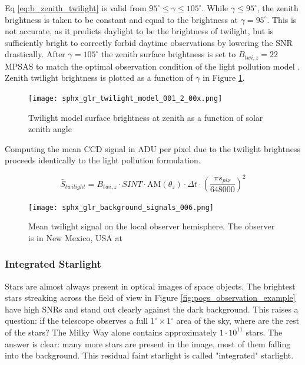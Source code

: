 Eq \ref{eq:b_zenith_twilight} is valid from $95^\circ \leq \gamma \leq 105^\circ$. While $\gamma \le 95^\circ$, the zenith brightness is taken to be constant and equal to the brightness at $\gamma = 95^\circ$. This is not accurate, as it predicts daylight to be the brightness of twilight, but is sufficiently bright to correctly forbid daytime observations by lowering the SNR drastically. After $\gamma = 105^\circ$ the zenith surface brightness is set to $B_{twi,z} = 22$ MPSAS to match the optimal observation condition of the light pollution model \cite{krag2003}. Zenith twilight brightness is plotted as a function of $\gamma$ in Figure \ref{fig:twilight_model}.

\begin{figure}[ht]
  \centering
  \texttt{[image: sphx\_glr\_twilight\_model\_001\_2\_00x.png]}
  \caption{Twilight model surface brightness at zenith as a function of solar zenith angle}
  \label{fig:twilight_model}
\end{figure}

Computing the mean CCD signal in ADU per pixel due to the twilight brightness proceeds identically to the light pollution formulation. 

\begin{equation} \label{eq:twilight_adu}
  \bar{S}_{twilight} = B_{twi,z} \cdot SINT \cdot \textrm{AM}(\theta_z) \cdot \Delta t \cdot \left( \frac{\pi s_{pix}}{648000} \right)^2
\end{equation}

\begin{figure}[ht]
  \centering
  \texttt{[image: sphx\_glr\_background\_signals\_006.png]}
  \caption{Mean twilight signal on the local observer hemisphere. The observer is in New Mexico, USA at
  \pogslla}
  \label{fig:pollution_hemi}
\end{figure}

\subsubsection{Integrated Starlight}

Stars are almost always present in optical images of space objects. The brightest stars streaking across the field of view in Figure \ref{fig:pogs_observation_example} have high SNRs and stand out clearly against the dark background. This raises a question: if the telescope observes a full $1^\circ \times 1^\circ$ area of the sky, where are the rest of the stars? The Milky Way alone contains approximately $1\cdot10^{11}$ stars. The answer is clear: many more stars are present in the image, most of them falling into the background. This residual faint starlight is called "integrated" starlight. 

